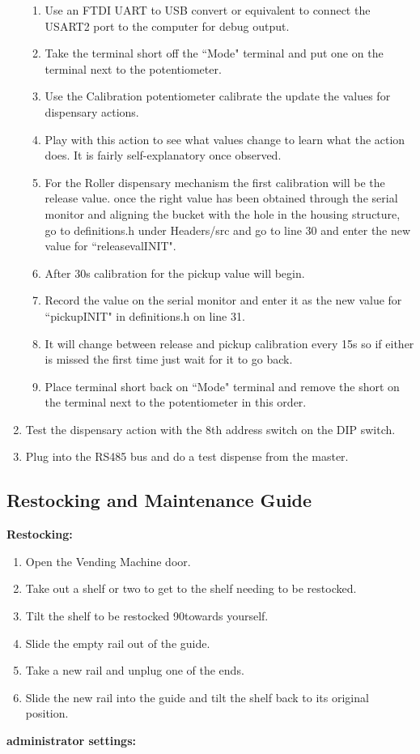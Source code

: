 \documentclass[a4paper,11pt]{article}
\numberwithin{figure}{section}
\numberwithin{table}{section}
\begin{document}
\begin{appendices}
\begin{enumerate}
{\begin{enumerate}
  \item Use an FTDI UART to USB convert or equivalent to connect the USART2 port to the computer for debug output.
  \item Take the terminal short off the ``Mode" terminal and put one on the terminal next to the potentiometer.
  \item Use the Calibration potentiometer calibrate the update the values for dispensary actions. 
  \item Play with this action to see what values change to learn what the action does. It is fairly self-explanatory once observed.
  \item For the Roller dispensary mechanism the first calibration will be the release value. once the right value has been obtained through the serial monitor and aligning the bucket with the hole in the housing structure, go to definitions.h under Headers/src and go to line 30 and enter the new value for ``releasevalINIT".
  \item After 30s calibration for the pickup value will begin.
  \item Record the value on the serial monitor and enter it as the new value for ``pickupINIT" in definitions.h on line 31.
  \item It will change between release and pickup calibration every 15s so if either is missed the first time just wait for it to go back.
  \item Place terminal short back on ``Mode" terminal and remove the short on the terminal next to the potentiometer in this order.
  \end{enumerate}}
  \item Test the dispensary action with the 8th address switch on the DIP switch.
  \item Plug into the RS485 bus and do a test dispense from the master.
\end{enumerate}

\subsection{Restocking and Maintenance Guide}
\label{subsec:maintenace}
\textbf{Restocking:}
\begin{enumerate}
\item Open the Vending Machine door.
\item Take out a shelf or two to get to the shelf needing to be restocked.
\item Tilt the shelf to be restocked 90\degree towards yourself.
\item Slide the empty rail out of the guide.
\item Take a new rail and unplug one of the ends.
\item Slide the new rail into the guide and tilt the shelf back to its original position.
\end{enumerate}
\textbf{administrator settings:}


\end{appendices}
\end{document}
